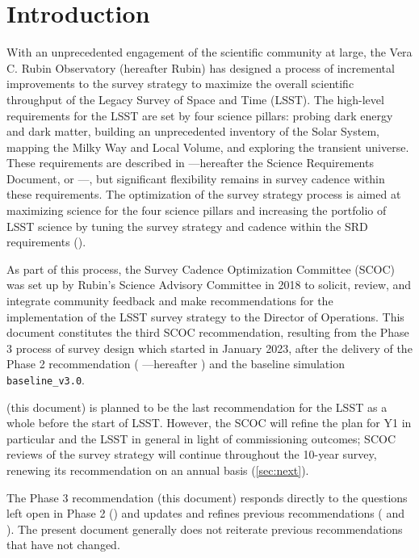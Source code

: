 \section{Introduction}

With an unprecedented engagement of the scientific community at large, the Vera C. Rubin Observatory (hereafter Rubin) has designed a process of incremental improvements to the survey strategy to maximize the overall scientific throughput of the Legacy Survey of Space and Time (LSST). The high-level requirements for the LSST are set by four science pillars: probing dark energy and dark matter, building an unprecedented inventory of the Solar System, mapping the Milky Way and Local Volume, and exploring the transient universe. 
These requirements are described in \cite{LPM-17} ---hereafter the Science Requirements Document, or ---, but significant flexibility remains in survey cadence within these requirements. The optimization of the survey strategy process is aimed at maximizing science for the four science pillars and increasing the portfolio of LSST science by tuning the survey strategy and cadence within the SRD requirements ().

As part of this process, the Survey Cadence Optimization Committee (SCOC) was set up by Rubin's Science Advisory Committee in 2018 to solicit, review, and integrate community feedback and make recommendations for the implementation of the LSST survey strategy to the Director of Operations. This document constitutes the third SCOC recommendation, resulting from the Phase 3 process of survey design which started in January 2023, after the delivery of the Phase 2 recommendation  (\citealt{PSTN-055} ---hereafter ) and the baseline simulation \texttt{baseline\_v3.0}. 

\cite{PSTN-056} (this document) is planned to be the last recommendation for the LSST as a whole before the start of LSST. However, the SCOC will refine the plan for Y1 in particular and the LSST in general in light of commissioning outcomes; SCOC reviews of the survey strategy will continue throughout the 10-year survey,  renewing its recommendation on an annual basis (\autoref{sec:next}). 

The Phase 3 recommendation (this document) responds directly to the questions left open in Phase 2 () and updates and refines previous recommendations ( and  ). The present document generally does not reiterate previous recommendations that have not changed.




